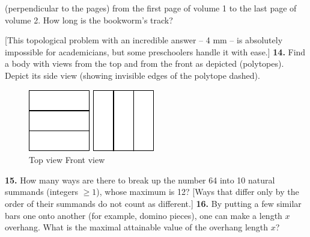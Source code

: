 \documentclass[12pt]{article}  %
\begin{document}
(perpendicular to the pages) from the first page of volume 1 to the last page of volume 2.
How long is the bookworm's track?

[This topological problem with an incredible answer -- 4 mm -- is absolutely impossible for academicians,
but some preschoolers handle it with ease.]  
\newline\newline\quad
{\bf 14.} Find a body with views from the top and from the front as depicted (polytopes).
Depict its side view (showing invisible edges of the polytope dashed).
\begin{figure}[h]
\centering
\footnotesize
\includegraphics[scale=1]{taskbook-99} \qquad\qquad
\includegraphics[scale=1]{taskbook-98}
\\[2pt]
\hspace{1pt} 
Top view
\hspace{43pt} Front view
\end{figure}
\newline\quad
{\bf 15.} How many ways are there to break up the number 64 into 10 natural summands (integers $\ge 1$),
whose maximum is 12?
[Ways that differ only by the order of their summands do not count as different.]
\newline\newline\quad
{\bf 16.} By putting a few similar bars one onto another (for example, domino pieces),
one can make a length $x$ overhang. What is the maximal attainable value of the overhang length $x$?
\end{document}
